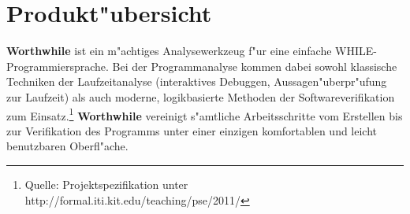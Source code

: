 \section{Produkt"ubersicht}%

\textbf{Worthwhile} ist ein m"achtiges Analysewerkzeug f"ur eine einfache WHILE-Programmiersprache. Bei der Programmanalyse kommen dabei sowohl klassische Techniken der Laufzeitanalyse (interaktives Debuggen, Aussagen"uberpr"ufung zur Laufzeit) als auch moderne, logikbasierte Methoden der Softwareverifikation zum Einsatz.\footnote{Quelle: Projektspezifikation unter http://formal.iti.kit.edu/teaching/pse/2011/} \textbf{Worthwhile} vereinigt s"amtliche Arbeitsschritte vom Erstellen bis zur Verifikation des Programms unter einer einzigen komfortablen und leicht benutzbaren Oberfl"ache.%
